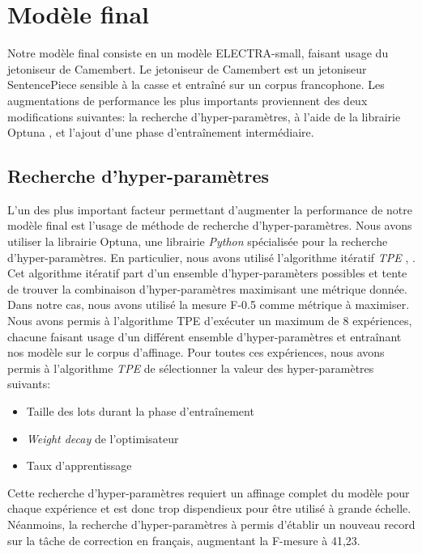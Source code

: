 \documentclass[12pt,twoside,maitrise]{dms}
\theoremstyle{definition}
\numberwithin{equation}{section}
\numberwithin{table}{chapter}
\numberwithin{figure}{chapter}
\begin{document}
\chapter{Modèle final}\label{chapitre:meilleurmodele}
Notre modèle final consiste en un modèle ELECTRA-small, faisant usage du
jetoniseur de Camembert. Le jetoniseur de Camembert est un jetoniseur
SentencePiece sensible à la casse et entraîné sur un corpus francophone. Les
augmentations de performance les plus importants proviennent des deux
modifications suivantes: la recherche d'hyper-paramètres, à l'aide de la
librairie Optuna \cite{akiba2019optuna}, et l'ajout d'une phase d'entraînement
intermédiaire.

\section{Recherche d'hyper-paramètres}
L'un des plus important facteur permettant d'augmenter la performance de notre
modèle final est l'usage de méthode de recherche d'hyper-paramètres. Nous avons
utiliser la librairie Optuna, une librairie \textit{Python} spécialisée pour la
recherche d'hyper-paramètres. En particulier, nous avons utilisé l'algorithme
itératif \textit{TPE}
\cite{watanabe2023treestructuredparzenestimatorunderstanding},
\cite{NIPS2011_86e8f7ab}. Cet algorithme itératif part d'un ensemble
d'hyper-paramèters possibles et tente de trouver la combinaison
d'hyper-paramètres maximisant une métrique donnée. Dans notre cas, nous avons
utilisé la mesure F-0.5 comme métrique à maximiser. Nous avons permis à
l'algorithme TPE d'exécuter un maximum de 8 expériences, chacune faisant usage
d'un différent ensemble d'hyper-paramètres et entraînant nos modèle sur le
corpus d'affinage. Pour toutes ces expériences, nous avons permis à
l'algorithme \textit{TPE} de sélectionner la valeur des hyper-paramètres
suivants:
\begin{itemize}
	\item Taille des lots durant la phase d'entraînement
	\item \textit{Weight decay} de l'optimisateur
	\item Taux d'apprentissage
\end{itemize}
Cette recherche d'hyper-paramètres requiert un affinage complet du
modèle pour chaque expérience et est donc trop dispendieux pour être
utilisé à grande échelle. Néanmoins, la recherche d'hyper-paramètres à
permis d'établir un nouveau record sur la tâche de correction en
français, augmentant la F-mesure à 41,23.
\end{document}
